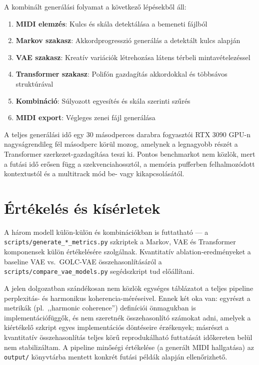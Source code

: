A kombinált generálási folyamat a következő lépésekből áll:

\begin{enumerate}
\item \textbf{MIDI elemzés}: Kulcs és skála detektálása a bemeneti fájlból
\item \textbf{Markov szakasz}: Akkordprogresszió generálás a detektált kulcs alapján
\item \textbf{VAE szakasz}: Kreatív variációk létrehozása látens térbeli mintavételezéssel
\item \textbf{Transformer szakasz}: Polifón gazdagítás akkordokkal és többsávos struktúrával
\item \textbf{Kombináció}: Súlyozott egyesítés és skála szerinti szűrés
\item \textbf{MIDI export}: Végleges zenei fájl generálása
\end{enumerate}

A teljes generálási idő egy 30 másodperces darabra fogyasztói RTX 3090 GPU-n nagyságrendileg fél másodperc körül mozog, amelynek a legnagyobb részét a Transformer szerkezet-gazdagítása teszi ki. Pontos benchmarkot nem közlök, mert a futási idő erősen függ a szekvenciahossztól, a memória pufferben felhalmozódott kontextustól és a multitrack mód be- vagy kikapcsolásától.

\section{Értékelés és kísérletek}

A három modell külön-külön és kombinációkban is futtatható --- a \texttt{scripts/generate\_*\_metrics.py} szkriptek a Markov, VAE és Transformer komponensek külön értékelésére szolgálnak. Kvantitatív ablation-eredményeket a baseline VAE vs.\ GOLC-VAE összehasonlításáról a \texttt{scripts/compare\_vae\_models.py} segédszkript tud előállítani.

A jelen dolgozatban szándékosan nem közlök egységes táblázatot a teljes pipeline perplexitás- és harmonikus koherencia-méréseivel. Ennek két oka van: egyrészt a metrikák (pl.\ ,,harmonic coherence'') definíciói önmagukban is implementációfüggők, és nem szeretnék összehasonlító számokat adni, amelyek a kiértékelő szkript egyes implementációs döntéseire érzékenyek; másrészt a kvantitatív összehasonlítás teljes körű reprodukálható futtatását időkereten belül nem stabilizáltam. A pipeline minőségi értékelése (a generált MIDI hallgatása) az \texttt{output/} könyvtárba mentett konkrét futási példák alapján ellenőrizhető.

